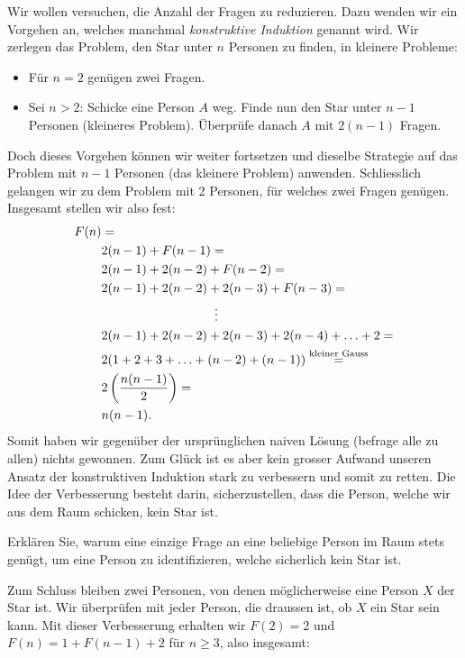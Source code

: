 Wir wollen versuchen, die Anzahl der Fragen zu reduzieren. Dazu wenden wir ein Vorgehen an, welches manchmal \textit{konstruktive Induktion} genannt wird. Wir zerlegen das Problem, den Star unter $n$ Personen zu finden, in kleinere Probleme:
\begin{itemize}
    \item Für $n=2$ genügen zwei Fragen.
    \item Sei $n>2$: Schicke eine Person $A$ weg. Finde nun den Star unter $n-1$ Personen (kleineres Problem). Überprüfe danach $A$ mit $2(n-1)$ Fragen.
\end{itemize}
Doch dieses Vorgehen können wir weiter fortsetzen und dieselbe Strategie auf das Problem mit $n-1$ Personen (das kleinere Problem) anwenden. Schliesslich gelangen wir zu dem Problem mit 2 Personen, für welches zwei Fragen genügen. Insgesamt stellen wir also fest:
\begin{align*}
    F(n) &= \\
    &2(n-1) + F(n-1) =\\
    &2(n-1) + 2(n-2) + F(n-2) =\\
    &2(n-1) + 2(n-2) + 2(n-3) + F(n-3) =\\
    &\quad\quad\quad\quad\quad\quad\quad\quad\quad\vdots \\
    &2(n-1) + 2(n-2) + 2(n-3) + 2(n-4) + \ldots + 2 =\\
    &2(1 + 2 + 3 +\ldots + (n-2) + (n-1)) \stackrel{\text{kleiner Gauss}}{=} \\
    &2\left(\frac{n(n-1)}{2}\right) = \\
    &n(n-1).
\end{align*}
Somit haben wir gegenüber der ursprünglichen naiven Lösung (befrage alle zu allen) nichts gewonnen. Zum Glück ist es aber kein grosser Aufwand unseren Ansatz der konstruktiven Induktion stark zu verbessern und somit zu retten. Die Idee der Verbesserung besteht darin, sicherzustellen, dass die Person, welche wir aus dem Raum schicken, kein Star ist.
\begin{myexercise}\label{myexercise:0351}
Erklären Sie, warum eine einzige Frage an eine beliebige Person im Raum stets genügt, um eine Person zu identifizieren, welche sicherlich kein Star ist.
\end{myexercise}
\noindent
Zum Schluss bleiben zwei Personen, von denen möglicherweise eine Person $X$ der Star ist. Wir überprüfen mit jeder Person, die draussen ist, ob $X$ ein Star sein kann. Mit dieser Verbesserung erhalten wir $F(2) = 2$ und $F(n) = 1 + F(n-1) + 2$ für $n\geq 3$, also insgesamt:
